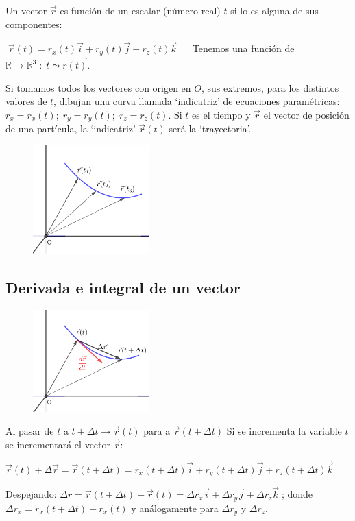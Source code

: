 \begin{multicols}{2}
Un vector $\vec r$ es función de un escalar (número real) $t$ si lo es alguna de sus componentes:

$\boxed{ \; \vec r(t)=r_x(t) \vec i + r_y(t) \vec j + r_z(t) \vec k \; } \quad$
Tenemos una función de $\mathbb R \to \mathbb R^3\; : \; t \leadsto \vec {r(t)}$. 

Si tomamos todos los vectores con origen en $O$, sus extremos, para los distintos valores de $t$, dibujan una curva llamada `indicatriz' de ecuaciones paramétricas: $r_x=r_x(t); \; r_y=r_y(t); \; r_z=r_z(t)$. Si $t$ es el tiempo y $\vec r$ el vector de posición de una partícula, la `indicatriz' $ \vec r (t)$ será la `trayectoria'.

	\begin{figure}[H]
	\centering
	\includegraphics[width=0.4\textwidth]{imagenes/imagenes10/T10IM17.png}
	\end{figure}
\end{multicols}

\subsection{Derivada e integral de un vector}

\begin{multicols}{2}
	\begin{figure}[H]
	\centering
	\includegraphics[width=0.4\textwidth]{imagenes/imagenes10/T10IM18.png}
	\end{figure}
Al pasar de $t$ a $t+ \Delta t \to \vec r (t)$ para a $\vec r (t+\Delta t)$ Si se incrementa la variable $t$ se incrementará el vector $\vec r$:

$\vec r (t) + \Delta \vec r = \vec r (t+\Delta t) = r_x (t+\Delta t) \vec i + r_y (t+\Delta t) \vec j + r_z (t+\Delta t) \vec k$

Despejando: $\Delta r =\vec r (t+\Delta t) - \vec r (t) = \Delta r_x \vec i +\Delta r_y \vec j +\Delta r_z \vec k \; $;  donde $\Delta r_x =  r_x (t+\Delta t) -  r_x (t) $ y análogamente para $\Delta r_y$ y $\Delta r_z$.
\end{multicols}

